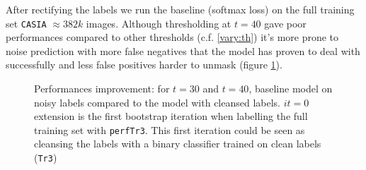 \documentclass[a4paper]{article}
\begin{document}
            After rectifying the labels we run the baseline (softmax loss) on the full training set \texttt{CASIA} $\approx 382k$ images. Although thresholding at $t=40$ gave poor performances compared to other thresholds (c.f. \ref{vary:th}) it's more prone to noise prediction with more false negatives that the model has proven to deal with successfully and less false positives harder to unmask (figure \ref{per:isnoisy}).
            \begin{figure}[H]
            \centering
            \caption{Performances improvement: for $t=30$ and $t=40$, baseline model on noisy labels compared to the model with cleansed labels. $it=0$ extension is the first bootstrap iteration when labelling the full training set with \texttt{perfTr3}. This first iteration could be seen as cleansing the labels with a binary classifier trained on clean labels (\texttt{Tr3})\label{per:isnoisy}}
            \end{figure}
\end{document}
